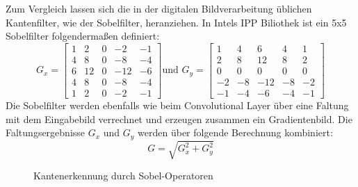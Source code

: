 \documentclass[runningheads,a4paper]{llncs}[2015/06/24]
\begin{document}
Zum Vergleich lassen sich die in der digitalen Bildverarbeitung üblichen Kantenfilter, wie der Sobelfilter, heranziehen. In Intels IPP Biliothek \cite{sobel} ist ein 5x5 Sobelfilter folgendermaßen definiert:
\[ G_{x}=
\begin{bmatrix}
1 & 2 & 0 & -2 & -1 \\
4 & 8 & 0 & -8 & -4 \\
6 & 12 & 0 & -12 & -6 \\
4 & 8 & 0 & -8 & -4 \\
1 & 2 & 0 & -2 & -1 
\end{bmatrix}
\text{und } G_{y}=
\begin{bmatrix}
1 & 4 & 6 & 4 & 1 \\
2 & 8 & 12 & 8 & 2 \\
0 & 0 & 0 & 0 & 0 \\
-2 & -8 & -12 & -8 & -2 \\
-1 & -4 & -6 & -4 & -1 
\end{bmatrix}
\]
Die Sobelfilter werden ebenfalls wie beim Convolutional Layer über eine Faltung mit dem Eingabebild verrechnet und erzeugen zusammen ein Gradientenbild. Die Faltungsergebnisse $G_x$ und $G_y$ werden über folgende Berechnung kombiniert: \[G = \sqrt{G_x^2+G_y^2}\]
\begin{figure}
	\centering
	\caption{Kantenerkennung durch Sobel-Operatoren}
	\label{fig:sobel}
\end{figure}
    
\end{document}
